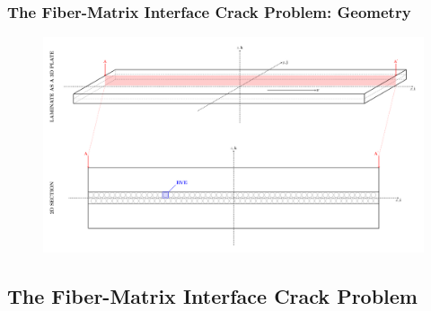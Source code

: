\documentclass[first,firstsupp,lastsupp,last,hyperref,table]{ETHclass}
\begin{document}
\begin{frame}
\frametitle{\small The Fiber-Matrix Interface Crack Problem: Geometry}
\vspace{-1cm}
\centering
\begin{figure}
\centering
\includegraphics[height=0.8\textheight]{laminate-section.pdf}
\label{fig:spread-tow-schematic}
\end{figure}
\end{frame}

\subsection{The Fiber-Matrix Interface Crack Problem}
\end{document}
